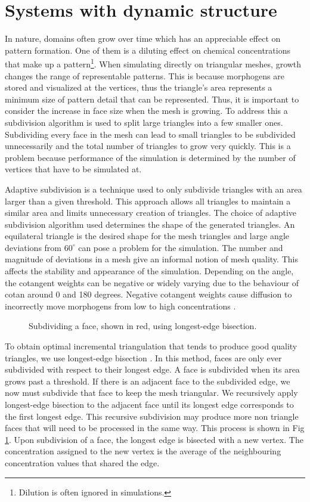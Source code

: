 \section{Systems with dynamic structure}
In nature, domains often grow over time which has an appreciable effect on pattern formation. One of them is a diluting effect on chemical concentrations that make up a pattern\footnote{Dilution is often ignored in simulations.}. When simulating directly on triangular meshes, growth changes the range of representable patterns. This is because morphogens are stored and visualized at the vertices, thus the triangle's area represents a minimum size of pattern detail that can be represented. Thus, it is important to consider the increase in face size when the mesh is growing. To address this a subdivision algorithm is used to split large triangles into a few smaller ones. Subdividing every face in the mesh can lead to small triangles to be subdivided unnecessarily and the total number of triangles to grow very quickly. This is a problem because performance of the simulation is determined by the number of vertices that have to be simulated at. 

Adaptive subdivision is a technique used to only subdivide triangles with an area larger than a given threshold. This approach allows all triangles to maintain a similar area and limits unnecessary creation of triangles. The choice of adaptive subdivision algorithm used determines the shape of the generated triangles. An equilateral triangle is the desired shape for the mesh triangles and large angle deviations from $60^{\circ}$ can pose a problem for the simulation. The number and magnitude of deviations in a mesh give an informal notion of mesh quality. This affects the stability and appearance of the simulation. Depending on the angle, the cotangent weights can be negative or widely varying due to the behaviour of cotan around 0 and 180 degrees. Negative cotangent weights cause diffusion to incorrectly move morphogens from low to high concentrations \citep{Wardetzky2007}. 

\begin{figure}[H]
	\centering
	\caption{Subdividing a face, shown in red, using longest-edge bisection.}
	\label{fig:recursiveSubdiv}
\end{figure}

To obtain optimal incremental triangulation that tends to produce good quality triangles, we use longest-edge bisection \citep{RIVARA1998}. In this method, faces are only ever subdivided with respect to their longest edge. A face is subdivided when its area grows past a threshold. If there is an adjacent face to the subdivided edge, we now must subdivide that face to keep the mesh triangular. We recursively apply longest-edge bisection to the adjacent face until its longest edge corresponds to the first longest edge. This recursive subdivision may produce more non triangle faces that will need to be processed in the same way. This process is shown in Fig \ref{fig:recursiveSubdiv}. Upon subdivision of a face, the longest edge is bisected with a new vertex. The concentration assigned to the new vertex is the average of the neighbouring concentration values that shared the edge.

